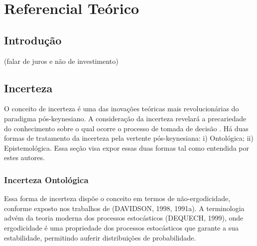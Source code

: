 

\chapter{Referencial Teórico} 
\label{referencial_teorico}

\section{Introdução}
\bigskip

(falar de juros e não de investimento)


\clearpage
\section{Incerteza}
\label{referencial_teorico/incerteza}

O conceito de incerteza é uma das inovações teóricas mais revolucionárias do paradigma pós-keynesiano. A consideração da incerteza revelará a precariedade do conhecimento sobre o qual ocorre o processo de tomada de decisão \parencite{carvalho_keynes_2020}. Há duas formas de tratamento da incerteza pela vertente pós-keynesiana: i) Ontológica; ii) Epistemológica. Essa seção visa expor essas duas formas tal como entendida por estes autores.

\subsection{Incerteza Ontológica}

Essa forma de incerteza dispõe o conceito em termos de não-ergodicidade, conforme exposto nos trabalhos de (DAVIDSON, 1998, 1991a). A terminologia advém da teoria moderna dos processos estocásticos (DEQUECH, 1999), onde ergodicidade é uma propriedade dos processos estocásticos que garante a sua estabilidade, permitindo auferir distribuições de probabilidade.

